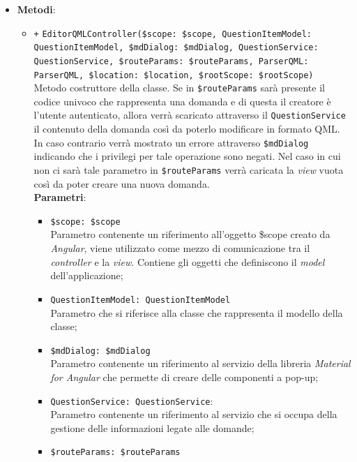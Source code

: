 \begin{itemize}
\begin{itemize}
	\end{itemize}
	\item \textbf{Metodi}:
	\begin{itemize}
		\item \texttt{+} \texttt{EditorQMLController(\$scope: \$scope, QuestionItemModel: \\QuestionItemModel, \$mdDialog: \$mdDialog, QuestionService: \\QuestionService, \$routeParams: \$routeParams, ParserQML: ParserQML, \$location: \$location, \$rootScope: \$rootScope)} \\ 
		Metodo costruttore della classe. Se in \texttt{\$routeParams} sarà presente il codice univoco che rappresenta una domanda e di questa il creatore è l'utente autenticato, allora verrà scaricato attraverso il \texttt{QuestionService} il contenuto della domanda così da poterlo modificare in formato QML. In caso contrario verrà mostrato un errore attraverso \texttt{\$mdDialog} indicando che i privilegi per tale operazione sono negati. Nel caso in cui non ci sarà tale parametro in \texttt{\$routeParams} verrà caricata la \textit{view} vuota così da poter creare una nuova domanda. \\
		\textbf{Parametri}:
		\begin{itemize}
			\item \texttt{\$scope: \$scope} \\
			Parametro contenente un riferimento all'oggetto \$scope creato da \textit{Angular}, viene utilizzato come mezzo di comunicazione tra il \textit{controller} e la \textit{view}. Contiene gli oggetti che definiscono il \textit{model} dell'applicazione;
			\item \texttt{QuestionItemModel: QuestionItemModel} \\ 
			Parametro che si riferisce alla classe che rappresenta il modello della classe;
			\item \texttt{\$mdDialog: \$mdDialog} \\
			Parametro contenente un riferimento al servizio della libreria \textit{Material for Angular} che permette di creare delle componenti a pop-up;
			\item \texttt{QuestionService: QuestionService}: \\
			Parametro contenente un riferimento al servizio che si occupa della gestione delle informazioni legate alle domande;
			\item \texttt{\$routeParams: \$routeParams} \\

\end{itemize}
\end{itemize}
\end{itemize}
